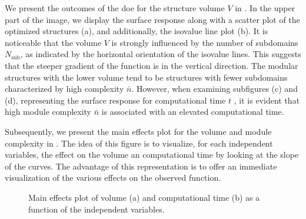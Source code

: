 We present the outcomes of the \gls{doe} for the structure volume $V$ in . In the upper part of the image, we display the surface response along with a scatter plot of the optimized structures (a), and additionally, the isovalue line plot (b). It is noticeable that the volume $V$ is strongly influenced by the number of subdomains $N_\text{sub}$, as indicated by the horizontal orientation of the isovalue lines. This suggests that the steeper gradient of the function is in the vertical direction. The modular structures with the lower volume tend to be structures with fewer subdomains characterized by high complexity $\bar{n}$. However, when examining subfigures (c) and (d), representing the surface response for computational time $t$ , it is evident that high module complexity $\bar{n}$ is associated with an elevated computational time.

Subsequently, we present the main effects plot for the volume and module complexity in . The idea of this figure is to visualize, for each independent variables, the effect on the volume an computational time by looking at the slope of the curves. The advantage of this representation is to offer an immediate visualization of the various effects on the observed function.
\begin{figure}
    \centering
    \bigskip
    \caption{Main effects plot of volume (a) and computational time (b) as a function of the independent variables.}
    \label{fig:05_doe_main_eff}
\end{figure}

